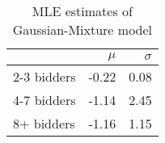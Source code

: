 \begin{table}
\centering
\caption{MLE estimates of Gaussian-Mixture model}
\label{tab:mleParam}
\begin{tabular}{lrr}
\toprule
{} & $\mu$ & $\sigma$ \\
\midrule
2-3 bidders & -0.22 &     0.08 \\
4-7 bidders & -1.14 &     2.45 \\
8+ bidders  & -1.16 &     1.15 \\
\bottomrule
\end{tabular}
\end{table}
